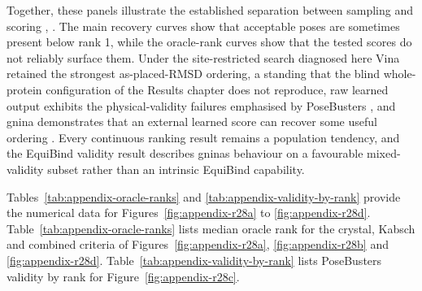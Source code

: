 Together, these panels illustrate the established separation between sampling and scoring \cite{ref050}, \cite{ref052}. The main recovery curves show that acceptable poses are sometimes present below rank 1, while the oracle-rank curves show that the tested scores do not reliably surface them. Under the site-restricted search diagnosed here Vina retained the strongest as-placed-RMSD ordering, a standing that the blind whole-protein configuration of the Results chapter does not reproduce, raw learned output exhibits the physical-validity failures emphasised by PoseBusters \cite{ref035}, and gnina demonstrates that an external learned score can recover some useful ordering \cite{ref067}. Every continuous ranking result remains a population tendency, and the EquiBind validity result describes gnina\textquotesingle s behaviour on a favourable mixed-validity subset rather than an intrinsic EquiBind capability.

Tables~\ref{tab:appendix-oracle-ranks} and \ref{tab:appendix-validity-by-rank} provide the numerical data for Figures~\ref{fig:appendix-r28a} to \ref{fig:appendix-r28d}. Table~\ref{tab:appendix-oracle-ranks} lists median oracle rank for the crystal, Kabsch and combined criteria of Figures~\ref{fig:appendix-r28a}, \ref{fig:appendix-r28b} and \ref{fig:appendix-r28d}. Table~\ref{tab:appendix-validity-by-rank} lists PoseBusters validity by rank for Figure~\ref{fig:appendix-r28c}.

